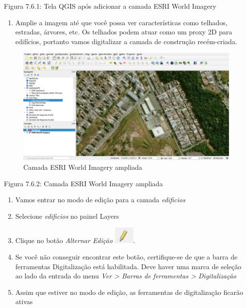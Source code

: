 \documentclass[
  portuguese,
]{krantz}
\providecommand{\tightlist}{%
  \setlength{\itemsep}{0pt}\setlength{\parskip}{0pt}}
\begin{document}
Figura 7.6.1: Tela QGIS após adicionar a camada ESRI World Imagery

\begin{enumerate}
\def\labelenumi{\arabic{enumi}.}
\setcounter{enumi}{4}
\tightlist
\item
  Amplie a imagem até que você possa ver características como telhados, estradas, árvores, etc. Os telhados podem atuar como um proxy 2D para edifícios, portanto vamos digitalizar a camada de construção recém-criada.
\end{enumerate}

\begin{figure}
\centering
\includegraphics{media/modulo7/digitize-zoom.png}
\caption{Camada ESRI World Imagery ampliada}
\end{figure}

Figura 7.6.2: Camada ESRI World Imagery ampliada

\begin{enumerate}
\def\labelenumi{\arabic{enumi}.}
\setcounter{enumi}{5}
\tightlist
\item
  Vamos entrar no modo de edição para a camada \emph{edificios}
\item
  Selecione \emph{edificios} no painel Layers
\item
  Clique no botão \emph{Alternar Edição} \includegraphics{media/modulo7/edit-layer.png}.
\item
  Se você não conseguir encontrar este botão, certifique-se de que a barra de ferramentas Digitalização está habilitada. Deve haver uma marca de seleção ao lado da entrada do menu \emph{Ver \textgreater{} Barras de ferramentas \textgreater{} Digitalização}
\item
  Assim que estiver no modo de edição, as ferramentas de digitalização ficarão ativas
\end{enumerate}
\end{document}
